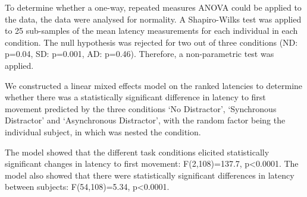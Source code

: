 \documentclass[10pt,letterpaper]{article}
\begin{document}
To determine whether a one-way, repeated measures ANOVA could be
applied to the data, the data were analysed for normality. A
Shapiro-Wilks test was applied to 25 sub-samples of the mean latency
measurements for each individual in each condition.
The null hypothesis was rejected for two out of three conditions (ND:
p=0.04, SD: p=0.001, AD: p=0.46). Therefore, a non-parametric test was
applied.

We constructed a linear mixed effects model on the ranked latencies to
determine whether there was a statistically significant difference in
latency to first movement predicted by the three conditions `No
Distractor', `Synchronous Distractor' and `Asynchronous
Distractor', with the random factor being the individual subject, in
which was nested the condition.

The model showed that the different task conditions elicited
statistically significant changes in latency to first movement:
F(2,108)=137.7, p\textless0.0001. The model also showed that there
were statistically significant differences in latency between
subjects: F(54,108)=5.34, p\textless0.0001.

\end{document}
